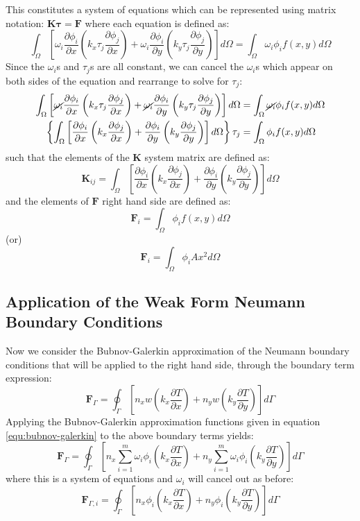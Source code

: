 \documentclass[letterpaper,10pt]{article}
\begin{document}
\noindent This constitutes a system of equations which can be represented using matrix notation: $\mathbf{K}\mathbf{\tau}=\mathbf{F}$ where each equation is defined as:
\[
\int_\Omega \left[ \omega_i\frac{\partial \phi_i}{\partial x}\left(k_x\tau_j\frac{\partial \phi_j}{\partial x}\right) +  \omega_i\frac{\partial \phi_i}{\partial y}\left(k_y\tau_j\frac{\partial \phi_j}{\partial y}\right) \right]d\Omega = \int_\Omega \omega_i\phi_if(x,y)d\Omega
\]
Since the $\omega_i$s and $\tau_j$s are all constant, we can cancel the $\omega_i$s which appear on both sides of the equation and rearrange to solve for $\tau_j$:
\[\begin{split}
\int_\Omega \left[ \cancel{\omega_i}\frac{\partial \phi_i}{\partial x}\left(k_x\tau_j\frac{\partial \phi_j}{\partial x}\right) +  \cancel{\omega_i}\frac{\partial \phi_i}{\partial y}\left(k_y\tau_j\frac{\partial \phi_j}{\partial y}\right) \right]d\Omega &= \int_\Omega \cancel{\omega_i}\phi_if(x,y)d\Omega
\\
\left\{\int_\Omega \left[ \frac{\partial \phi_i}{\partial x}\left(k_x\frac{\partial \phi_j}{\partial x}\right) + \frac{\partial \phi_i}{\partial y}\left(k_y\frac{\partial \phi_j}{\partial y}\right) \right]d\Omega\right\}\tau_j &= \int_\Omega \phi_if(x,y)d\Omega
\end{split}\]
\noindent such that the elements of the $\mathbf{K}$ system matrix are defined as:
\begin{equation}
\label{equ:Kij}
\boxed{\mathbf{K}_{ij} = \int_\Omega \left[ \frac{\partial \phi_i}{\partial x}\left(k_x\frac{\partial \phi_j}{\partial x}\right) + \frac{\partial \phi_i}{\partial y}\left(k_y\frac{\partial \phi_j}{\partial y}\right) \right]d\Omega}
\end{equation}
\noindent and the elements of $\mathbf{F}$ right hand side are defined as:
\begin{equation}
\label{equ:Fi}
\boxed{\mathbf{F}_i = \int_\Omega \phi_if(x,y)d\Omega}
\end{equation}
(or)
\[\mathbf{F}_i = \int_\Omega \phi_iAx^2d\Omega\]

\subsection{Application of the Weak Form Neumann Boundary Conditions}
Now we consider the Bubnov-Galerkin approximation of the Neumann boundary conditions that will be applied to the right hand side, through the boundary term expression:
\[
\mathbf{F}_\Gamma = \oint_\Gamma \left[n_xw\left(k_x\frac{\partial T}{\partial x}\right) + n_yw\left(k_y\frac{\partial T}{\partial y}\right)\right]d\Gamma
\]
\noindent Applying the Bubnov-Galerkin approximation functions given in equation \ref{equ:bubnov-galerkin} to the above boundary terms yields:
\[
\mathbf{F}_\Gamma = \oint_\Gamma \left[n_x\displaystyle\sum\limits_{i=1}^m\omega_i\phi_i\left(k_x\frac{\partial T}{\partial x}\right) + n_y\displaystyle\sum\limits_{i=1}^m\omega_i\phi_i\left(k_y\frac{\partial T}{\partial y}\right)\right]d\Gamma
\]
\noindent where this is a system of equations and $\omega_i$ will cancel out as before:
\[
\mathbf{F}_{\Gamma,i} = \oint_\Gamma \left[n_x\phi_i\left(k_x\frac{\partial T}{\partial x}\right) + n_y\phi_i\left(k_y\frac{\partial T}{\partial y}\right)\right]d\Gamma
\]
\end{document}
